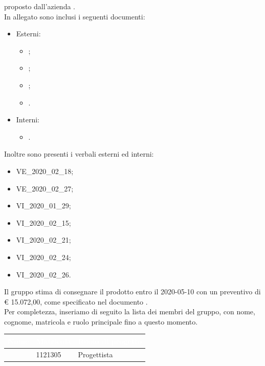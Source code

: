\documentclass[12pt]{letter}
\begin{document}
\begin{letter}
        proposto dall'azienda \textbf{\Proponente{}}.\\
        In allegato sono inclusi i seguenti documenti:
        \begin{itemize}
            \item Esterni:
            \begin{itemize}
                \item {};
                \item {};
                \item {};
                \item {}.
            \end{itemize}
            \item Interni:
            \begin{itemize}
                \item {}.
            \end{itemize}
        \end{itemize}
        Inoltre sono presenti i verbali esterni ed interni:
        \begin{itemize}
            \item VE\_2020\_02\_18;
            \item VE\_2020\_02\_27;
            \item VI\_2020\_01\_29;
            \item VI\_2020\_02\_15;
            \item VI\_2020\_02\_21;
            \item VI\_2020\_02\_24;
            \item VI\_2020\_02\_26.
        \end{itemize}
        Il gruppo stima di consegnare il prodotto entro il 2020-05-10 con un preventivo di \euro{} 15.072,00, come specificato nel documento \PdP{}.\\
        Per completezza, inseriamo di seguito la lista dei membri del gruppo, con nome, cognome, matricola e ruolo principale fino a questo momento.
        {
            \renewcommand{\arraystretch}{1.5}
            \begin{longtable}{ C{4cm} C{3cm} C{6cm} }
                \textcolor{white}{\textbf{Nome}} & \textcolor{white}{\textbf{Matricola}} & \textcolor{white}{\textbf{Ruolo di progetto}}\\
                \endhead 
                \MC{} & 1121305 & Progettista \\

\end{longtable}}
\end{letter}
\end{document}
